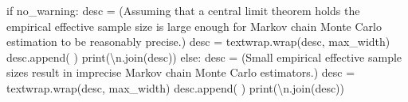 \documentclass[
  letterpaper,
  DIV=11,
  numbers=noendperiod]{scrartcl}
\newenvironment{Shaded}{\begin{snugshade}}{\end{snugshade}}
\newcommand{\BuiltInTok}[1]{\textcolor[rgb]{0.00,0.23,0.31}{#1}}
\newcommand{\CharTok}[1]{\textcolor[rgb]{0.13,0.47,0.30}{#1}}
\newcommand{\ControlFlowTok}[1]{\textcolor[rgb]{0.00,0.23,0.31}{#1}}
\newcommand{\NormalTok}[1]{\textcolor[rgb]{0.00,0.23,0.31}{#1}}
\newcommand{\OperatorTok}[1]{\textcolor[rgb]{0.37,0.37,0.37}{#1}}
\newcommand{\StringTok}[1]{\textcolor[rgb]{0.13,0.47,0.30}{#1}}
\begin{document}
\begin{Shaded}
\begin{Highlighting}[]
  \ControlFlowTok{if}\NormalTok{ no\_warning:}
\NormalTok{    desc }\OperatorTok{=}\NormalTok{ (}\StringTok{\textquotesingle{}Assuming that a central limit theorem holds the \textquotesingle{}}
            \StringTok{\textquotesingle{}empirical effective sample size is large enough \textquotesingle{}}
            \StringTok{\textquotesingle{}for Markov chain Monte Carlo estimation to be\textquotesingle{}}
            \StringTok{\textquotesingle{}reasonably precise.\textquotesingle{}}\NormalTok{)}
\NormalTok{    desc }\OperatorTok{=}\NormalTok{ textwrap.wrap(desc, max\_width)}
\NormalTok{    desc.append(}\StringTok{\textquotesingle{} \textquotesingle{}}\NormalTok{)}
    \BuiltInTok{print}\NormalTok{(}\StringTok{\textquotesingle{}}\CharTok{\textbackslash{}n}\StringTok{\textquotesingle{}}\NormalTok{.join(desc))}
  \ControlFlowTok{else}\NormalTok{:}
\NormalTok{    desc }\OperatorTok{=}\NormalTok{ (}\StringTok{\textquotesingle{}Small empirical effective sample sizes result in \textquotesingle{}}
            \StringTok{\textquotesingle{}imprecise Markov chain Monte Carlo estimators.\textquotesingle{}}\NormalTok{)}
\NormalTok{    desc }\OperatorTok{=}\NormalTok{ textwrap.wrap(desc, max\_width)}
\NormalTok{    desc.append(}\StringTok{\textquotesingle{} \textquotesingle{}}\NormalTok{)}
    \BuiltInTok{print}\NormalTok{(}\StringTok{\textquotesingle{}}\CharTok{\textbackslash{}n}\StringTok{\textquotesingle{}}\NormalTok{.join(desc))}
\end{Highlighting}
\end{Shaded}
\end{document}
